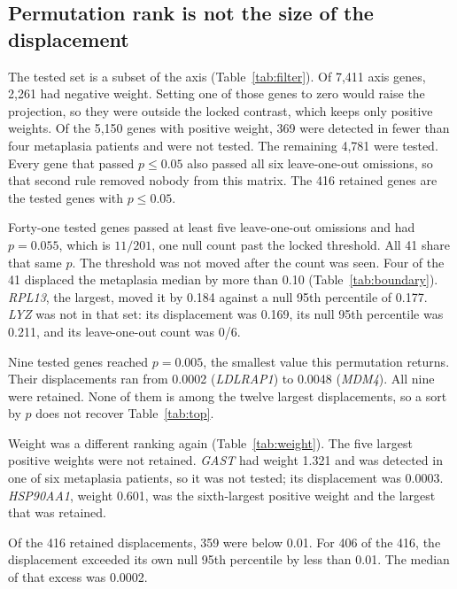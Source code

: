 \documentclass[11pt,a4paper]{article}
\begin{document}
\subsection{Permutation rank is not the size of the displacement}

The tested set is a subset of the axis (Table~\ref{tab:filter}). Of 7{,}411 axis genes, 2{,}261 had negative weight. Setting one of those genes to zero would raise the projection, so they were outside the locked contrast, which keeps only positive weights. Of the 5{,}150 genes with positive weight, 369 were detected in fewer than four metaplasia patients and were not tested. The remaining 4{,}781 were tested. Every gene that passed \(p\le 0.05\) also passed all six leave-one-out omissions, so that second rule removed nobody from this matrix. The 416 retained genes are the tested genes with \(p\le 0.05\).

Forty-one tested genes passed at least five leave-one-out omissions and had \(p=0.055\), which is \(11/201\), one null count past the locked threshold. All 41 share that same \(p\). The threshold was not moved after the count was seen. Four of the 41 displaced the metaplasia median by more than 0.10 (Table~\ref{tab:boundary}). \textit{RPL13}, the largest, moved it by 0.184 against a null 95th percentile of 0.177. \textit{LYZ} was not in that set: its displacement was 0.169, its null 95th percentile was 0.211, and its leave-one-out count was 0/6.

Nine tested genes reached \(p=0.005\), the smallest value this permutation returns. Their displacements ran from 0.0002 (\textit{LDLRAP1}) to 0.0048 (\textit{MDM4}). All nine were retained. None of them is among the twelve largest displacements, so a sort by \(p\) does not recover Table~\ref{tab:top}.

Weight was a different ranking again (Table~\ref{tab:weight}). The five largest positive weights were not retained. \textit{GAST} had weight 1.321 and was detected in one of six metaplasia patients, so it was not tested; its displacement was 0.0003. \textit{HSP90AA1}, weight 0.601, was the sixth-largest positive weight and the largest that was retained.

Of the 416 retained displacements, 359 were below 0.01. For 406 of the 416, the displacement exceeded its own null 95th percentile by less than 0.01. The median of that excess was 0.0002.
\end{document}
